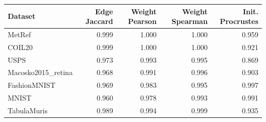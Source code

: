 \begin{tabular}{lrrrr}
\toprule
Dataset & Edge Jaccard & Weight Pearson & Weight Spearman & Init. Procrustes \\
\midrule
MetRef & 0.999 & 1.000 & 1.000 & 0.959 \\
COIL20 & 0.999 & 1.000 & 1.000 & 0.921 \\
USPS & 0.973 & 0.993 & 0.995 & 0.869 \\
Macosko2015\_retina & 0.968 & 0.991 & 0.996 & 0.903 \\
FashionMNIST & 0.969 & 0.983 & 0.995 & 0.997 \\
MNIST & 0.960 & 0.978 & 0.993 & 0.991 \\
TabulaMuris & 0.989 & 0.994 & 0.999 & 0.935 \\
\bottomrule
\end{tabular}
